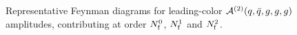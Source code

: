 \begin{figure}[ht]
  \begin{center}
\end{center} 
\caption{Representative Feynman diagrams for leading-color
$\mathcal{A}^{(2)}(q,\bar q,g,g,g)$ amplitudes, 
contributing at order
 $N_\mathrm{f}^0$, $N_\mathrm{f}^1$ and $N_\mathrm{f}^2$.}
\label{fig_parents2q3g}
\end{figure}

